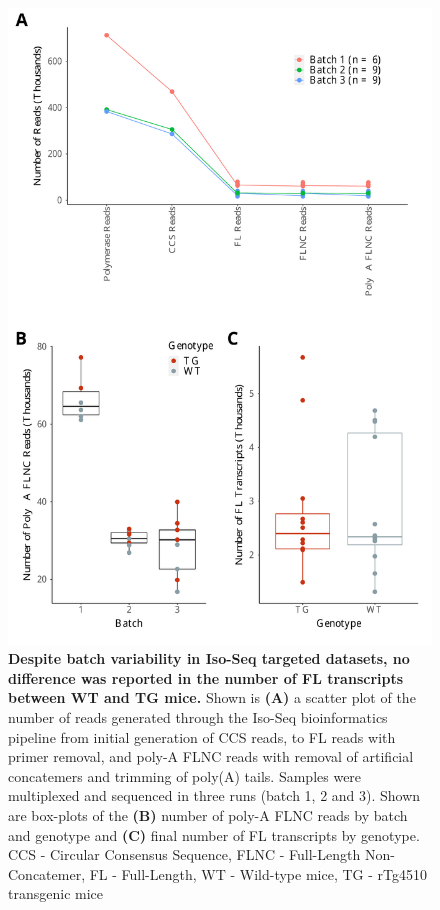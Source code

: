 \begin{figure}[!htp]
	\begin{center}
		\includegraphics[page=1,trim={0 1cm 0 0},clip,scale = 0.55]{Figures/TargetedTranscriptome.pdf}
	\end{center}
	\captionsetup{width=0.95\textwidth}
	\caption[Iso-Seq sequencing metrics from targeted profiling of rTg4510 mice]%
	{\textbf{Despite batch variability in Iso-Seq targeted datasets, no difference was reported in the number of FL transcripts between WT and TG mice.} Shown is \textbf{(A)} a scatter plot of the number of reads generated through the Iso-Seq bioinformatics pipeline from initial generation of CCS reads, to FL reads with primer removal, and poly-A FLNC reads with removal of artificial concatemers and trimming of poly(A) tails. Samples were multiplexed and sequenced in three runs (batch 1, 2 and 3). Shown are box-plots of the \textbf{(B)} number of poly-A FLNC reads by batch and genotype and \textbf{(C)} final number of FL transcripts by genotype. CCS - Circular Consensus Sequence, FLNC - Full-Length Non-Concatemer, FL - Full-Length, WT - Wild-type mice, TG - rTg4510 transgenic mice}
	\label{fig:isoseq_targeted_run_output}
\end{figure}

